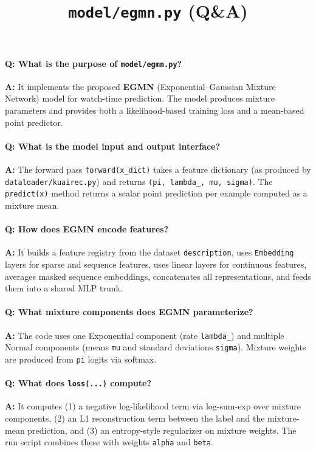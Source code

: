 \documentclass[11pt]{article}
\title{\texttt{model/egmn.py} (Q\&A)}
\author{}
\date{}
\begin{document}
\maketitle

\paragraph{Q: What is the purpose of \texttt{model/egmn.py}?}
\textbf{A:} It implements the proposed \textbf{EGMN} (Exponential--Gaussian Mixture Network) model for watch-time prediction. The model produces mixture parameters and provides both a likelihood-based training loss and a mean-based point predictor.

\paragraph{Q: What is the model input and output interface?}
\textbf{A:} The forward pass \lstinline|forward(x_dict)| takes a feature dictionary (as produced by \lstinline|dataloader/kuairec.py|) and returns \lstinline|(pi, lambda_, mu, sigma)|. The \lstinline|predict(x)| method returns a scalar point prediction per example computed as a mixture mean.

\paragraph{Q: How does EGMN encode features?}
\textbf{A:} It builds a feature registry from the dataset \lstinline|description|, uses \lstinline|Embedding| layers for sparse and sequence features, uses linear layers for continuous features, averages masked sequence embeddings, concatenates all representations, and feeds them into a shared MLP trunk.

\paragraph{Q: What mixture components does EGMN parameterize?}
\textbf{A:} The code uses one Exponential component (rate \lstinline|lambda_|) and multiple Normal components (means \lstinline|mu| and standard deviations \lstinline|sigma|). Mixture weights are produced from \lstinline|pi| logits via softmax.

\paragraph{Q: What does \lstinline|loss(...)| compute?}
\textbf{A:} It computes (1) a negative log-likelihood term via log-sum-exp over mixture components, (2) an L1 reconstruction term between the label and the mixture-mean prediction, and (3) an entropy-style regularizer on mixture weights. The run script combines these with weights \lstinline|alpha| and \lstinline|beta|.
\end{document}
